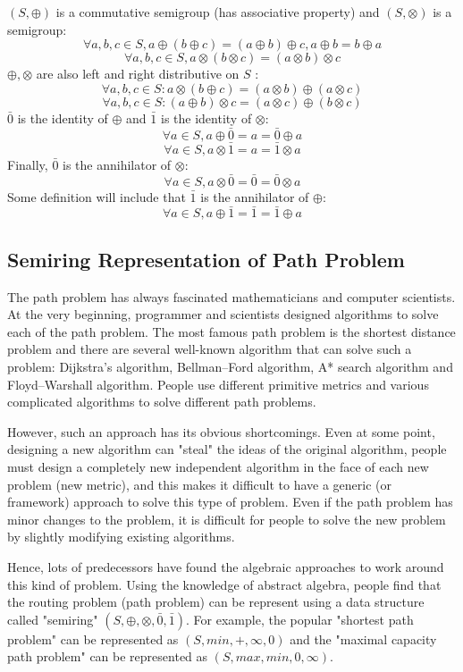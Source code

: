 \documentclass[a4paper,10pt]{article}
\begin{document}
$(S,\oplus)$ is a commutative semigroup (has associative property) and $(S,\otimes)$ is a semigroup:
\[
\forall a,b,c \in S, a \oplus (b\oplus c) = (a \oplus b) \oplus c,a \oplus b = b \oplus a
\]
\[
\forall a,b,c \in S, a \otimes (b\otimes c) = (a \otimes b) \otimes c
\]
$\oplus,\otimes$ are also left and right distributive on $S$ : 
\[
\forall a,b,c \in S: a \otimes(b \oplus c) = (a \otimes b) \oplus (a \otimes c)
\]
\[
\forall a,b,c \in S:(a \oplus b) \otimes c  = (a \otimes c) \oplus (b \otimes c)
\] 
$\bar0$ is the identity of $\oplus$ and  $\bar1$ is the identity of $\otimes$: 
\[\forall a \in S, a \oplus \bar{0} = a = \bar{0} \oplus a\]
\[\forall a \in S, a \otimes \bar{1} = a = \bar{1} \otimes a\]
Finally, $\bar0$ is the  annihilator of $\otimes$: 
\[\forall a \in S, a \otimes \bar{0} = \bar{0} = \bar{0} \otimes a\]
Some definition will include that $\bar1$ is the annihilator of $\oplus$:
\[\forall a \in S, a \oplus \bar{1} = \bar{1} = \bar{1} \oplus a\]
\subsection{Semiring Representation of Path Problem}
The path problem has always fascinated mathematicians and computer scientists. 
At the very beginning, programmer and scientists designed algorithms to solve each of the path problem. 
The most famous path problem is the shortest distance problem and there are several well-known algorithm that can solve such a problem: Dijkstra's algorithm, Bellman–Ford algorithm, A* search algorithm and Floyd–Warshall algorithm. People use different primitive metrics and various complicated algorithms to solve different path problems.

However, such an approach has its obvious shortcomings. Even at some point, designing a new algorithm can "steal" the ideas of the original algorithm, people must design a completely new independent algorithm in the face of each new problem (new metric), and this makes it difficult to have a generic (or framework) approach to solve this type of problem.  Even if the path problem has minor changes to the problem, it is difficult for people to solve the new problem by slightly modifying existing algorithms. 

Hence, lots of predecessors have found the algebraic approaches to work around this kind of problem. 
Using the knowledge of abstract algebra, people find that the routing problem (path problem) can be represent using a data structure called "semiring" $(S,\oplus,\otimes,\bar{0},\bar{1})$\cite{carre_algebra_1971,WONGSEELASHOTE197955,dynerowicz_forwarding_2013,mohri_semiring_2002,gurney_lexicographic_2007}. For example, the popular "shortest path problem" can be represented as $(S, min,+,\infty,0)$\cite{mohri_semiring_2002} and the "maximal capacity path problem" can be represented as $(S, max,min, 0, \infty)$. 
\end{document}
